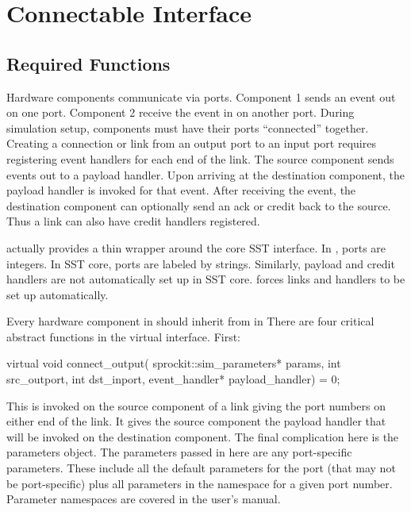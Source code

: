 
\chapter{\sstmacro Connectable Interface}\label{chapter:connectables}

\section{Required Functions}

Hardware components communicate via ports. Component 1 sends an event out on one port.
Component 2 receive the event in on another port.
During simulation setup, components must have their ports ``connected'' together.
Creating a connection or link from an output port to an input port requires registering event handlers for each end of the link.
The source component sends events out to a payload handler. 
Upon arriving at the destination component, the payload handler is invoked for that event.
After receiving the event, the destination component can optionally send an ack or credit back to the source.
Thus a link can also have credit handlers registered.

\sstmacro actually provides a thin wrapper around the core SST interface.
In \sstmacro, ports are integers.
In SST core, ports are labeled by strings.
Similarly, payload and credit handlers are not automatically set up in SST core.
\sstmacro forces links and handlers to be set up automatically.

Every hardware component in \sstmacro should inherit from  in 
There are four critical abstract functions in the virtual interface. First:

\begin{CppCode}
  virtual void connect_output(
    sprockit::sim_parameters* params,
    int src_outport,
    int dst_inport,
    event_handler* payload_handler) = 0;
\end{CppCode}
This is invoked on the source component of a link giving the port numbers on either end of the link.
It gives the source component the payload handler that will be invoked on the destination component.
The final complication here is the parameters object.
The parameters passed in here are any port-specific parameters.
These include all the default parameters for the port (that may not be port-specific)
plus all parameters in the namespace  for a given port number.
Parameter namespaces are covered in the user's manual.

